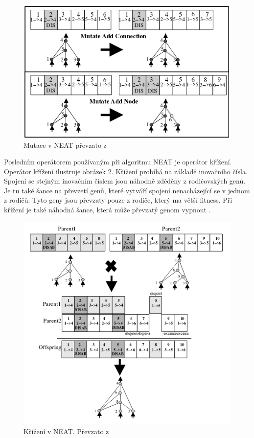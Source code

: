 \begin{figure}[h!]
	\centering
	\includegraphics[scale=0.3]{neatMutation}
	\caption{Mutace v NEAT převzato z \cite[s.~10]{NEAT}}
	\label{fig:neatmutation}
\end{figure}

Posledním operátorem používaným při algoritmu NEAT je operátor křížení. Operátor křížení ilustruje obrázek \ref{fig:neatcrossover}. Křížení probíhá na základě inovačního čísla. Spojení se stejným inovačním číslem jsou náhodně zděděny z rodičovských genů. Je tu také šance na převzetí genů, které vytváří spojení nenacházející se v jednom z rodičů. Tyto geny jsou převzaty pouze z rodiče, který ma větší fitness. Při křížení je také náhodná šance, která může převzatý genom vypnout \cite[s.~12]{NEAT}.

\begin{figure}[h!]
	\centering
	\includegraphics[width=0.6\linewidth]{neatCrossover}
	\caption{Křížení v NEAT. Převzato z \cite[s.~12]{NEAT}}
	\label{fig:neatcrossover}
\end{figure}

